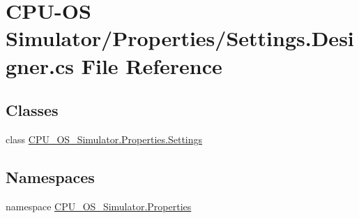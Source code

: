 \hypertarget{_c_p_u-_o_s_01_simulator_2_properties_2_settings_8_designer_8cs}{}\section{C\+P\+U-\/\+O\+S Simulator/\+Properties/\+Settings.Designer.\+cs File Reference}
\label{_c_p_u-_o_s_01_simulator_2_properties_2_settings_8_designer_8cs}
\subsection*{Classes}
\begin{DoxyCompactItemize}
\item 
class \hyperlink{class_c_p_u___o_s___simulator_1_1_properties_1_1_settings}{C\+P\+U\+\_\+\+O\+S\+\_\+\+Simulator.\+Properties.\+Settings}
\end{DoxyCompactItemize}
\subsection*{Namespaces}
\begin{DoxyCompactItemize}
\item 
namespace \hyperlink{namespace_c_p_u___o_s___simulator_1_1_properties}{C\+P\+U\+\_\+\+O\+S\+\_\+\+Simulator.\+Properties}
\end{DoxyCompactItemize}
